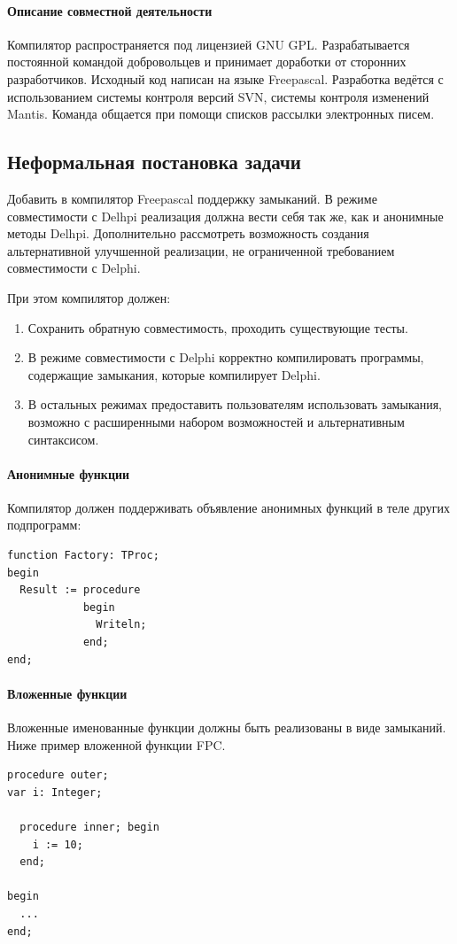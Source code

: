 \documentclass{imcs}
\begin{document}
\paragraph{Описание совместной деятельности}

Компилятор распространяется под лицензией GNU GPL. Разрабатывается
постоянной командой добровольцев и принимает доработки от сторонних разработчиков.
Исходный код написан на языке Freepascal. Разработка ведётся с использованием системы
контроля версий SVN, системы контроля изменений Mantis. Команда общается при
помощи списков рассылки электронных писем.

\subsection{Неформальная постановка задачи}

Добавить в компилятор Freepascal поддержку замыканий. В режиме совместимости с 
Delhpi реализация должна вести себя так же, как и анонимные методы
Delhpi. Дополнительно рассмотреть возможность создания альтернативной улучшенной
реализации, не ограниченной требованием совместимости с Delphi.

При этом компилятор должен:
\begin{enumerate}
    \item Сохранить обратную совместимость, проходить существующие тесты. 
    \item В режиме совместимости с Delphi корректно компилировать программы,
содержащие замыкания, которые компилирует Delphi.
    \item В остальных режимах предоставить пользователям использовать замыкания,
возможно с расширенными набором возможностей и альтернативным синтаксисом.
\end{enumerate}

\paragraph{Анонимные функции}
Компилятор должен поддерживать объявление анонимных функций в теле других подпрограмм:
\begin{lstlisting}
function Factory: TProc;
begin
  Result := procedure
            begin
              Writeln;
            end;
end;
\end{lstlisting}

\paragraph{Вложенные функции}
Вложенные именованные функции должны быть реализованы в виде замыканий. Ниже пример
вложенной функции FPC.
\begin{lstlisting}    
procedure outer;
var i: Integer;

  procedure inner; begin
    i := 10;
  end;

begin
  ...
end;    
\end{lstlisting}
\end{document}

